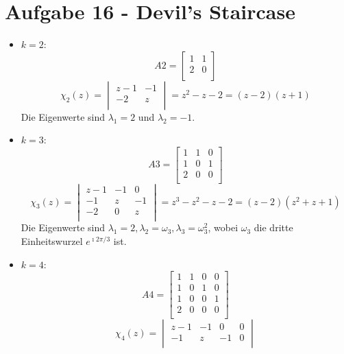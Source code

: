 \section*{Aufgabe 16 - Devil's Staircase}
\begin{flushenum}
\item
	\begin{itemize}
		\item $k= 2$: 
			\[ A2 = \begin{bmatrix}
					1 & 1 \\
					2 & 0 \\
				\end{bmatrix} \]
			\[ \chi_2(z) = 
				\begin{vmatrix}
					z - 1 & -1 \\
					-2    & z  \\
				\end{vmatrix} =
				z^2 - z - 2 = (z-2)(z+1) \]
			Die Eigenwerte sind $\lambda_1 = 2$ und $\lambda_2 = -1$.
		\item $k = 3$:
			\[ A3 = \begin{bmatrix}
					1 & 1 & 0 \\
					1 & 0 & 1 \\
					2 & 0 & 0 \\
				\end{bmatrix} \]
			\[ \chi_3(z) = 
				\begin{vmatrix}
					z-1 & -1 & 0 \\
					-1 & z & -1 \\
					-2 & 0 & z \\
				\end{vmatrix} =
				z^3 - z^2 - z - 2 = (z-2)(z^2 + z + 1) \]
			Die Eigenwerte sind $\lambda_1 = 2, \lambda_2 = \omega_3, \lambda_3 = \omega_3^2 $,
			wobei $\omega_3$ die dritte Einheitswurzel $e^{\imath 2 \pi / 3}$ ist.
		\item $k = 4$:
			\[ A4 =	\begin{bmatrix}
					1 & 1 & 0 & 0 \\
					1 & 0 & 1 & 0 \\
					1 & 0 & 0 & 1 \\
					2 & 0 & 0 & 0 \\
				\end{bmatrix} \]
			\[ \chi_4(z) = 
				\begin{vmatrix}
					z-1 & -1 & 0 & 0 \\
					-1 & z & -1 & 0 \\

\end{vmatrix}\]
\end{itemize}
\end{flushenum}
